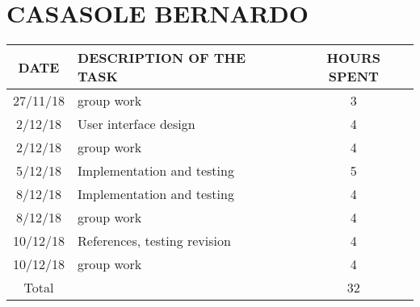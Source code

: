 \clearpage

\section{CASASOLE BERNARDO}
\begin{table}[h!]
	\begin{tabular}{|c|p{3in}|c|}
\hline
\textbf{DATE} &\textbf{DESCRIPTION OF THE TASK} & \textbf{HOURS SPENT}\\
\hline
27/11/18 & group work & 3\\
\hline
2/12/18 & User interface design & 4\\
\hline
2/12/18 & group work & 4\\
\hline
5/12/18 & Implementation and testing & 5\\
\hline
8/12/18 & Implementation and testing & 4\\
\hline
8/12/18 & group work & 4\\
\hline
10/12/18 &  References, testing revision  & 4\\
\hline
10/12/18 & group work & 4\\
\hline
Total & & 32\\
\hline
	\end{tabular}
\end{table}